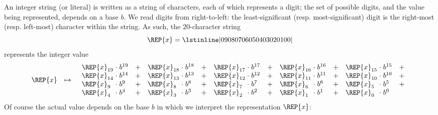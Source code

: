 %


An integer string (or literal) is written as a string of characters, 
each of which represents a digit; the set of possible digits, and the 
value being represented, depends on a base $b$.  We read digits from 
right-to-left: the least-significant (resp. most-significant) digit 
is the right-most (resp. left-most) character within the string.
As such, the $20$-character string
\[
      \REP{x}  =        \mbox{\lstinline|09080706050403020100|}
\]
represents the integer value
\[
      \begin{array}{lcl}
      \REP{x} &\mapsto& \begin{array}{*{5}{l@{\;}c@{\;}lc}}
                        \REP{x}_{19}  &\cdot&  b^{19} &+&
                        \REP{x}_{18}  &\cdot&  b^{18} &+&
                        \REP{x}_{17}  &\cdot&  b^{17} &+&
                        \REP{x}_{16}  &\cdot&  b^{16} &+&
                        \REP{x}_{15}  &\cdot&  b^{15} &+\\
                        \REP{x}_{14}  &\cdot&  b^{14} &+&
                        \REP{x}_{13}  &\cdot&  b^{13} &+&
                        \REP{x}_{12}  &\cdot&  b^{12} &+&
                        \REP{x}_{11}  &\cdot&  b^{11} &+&
                        \REP{x}_{10}  &\cdot&  b^{10} &+\\
                        \REP{x}_{ 9}  &\cdot&  b^{ 9} &+&
                        \REP{x}_{ 8}  &\cdot&  b^{ 8} &+&
                        \REP{x}_{ 7}  &\cdot&  b^{ 7} &+&
                        \REP{x}_{ 6}  &\cdot&  b^{ 6} &+&
                        \REP{x}_{ 5}  &\cdot&  b^{ 5} &+\\                    
                        \REP{x}_{ 4}  &\cdot&  b^{ 4} &+&
                        \REP{x}_{ 3}  &\cdot&  b^{ 3} &+&
                        \REP{x}_{ 2}  &\cdot&  b^{ 2} &+&
                        \REP{x}_{ 1}  &\cdot&  b^{ 1} &+&
                        \REP{x}_{ 0}  &\cdot&  b^{ 0} & \\
                        \end{array}
      \end{array}
\]
Of course the actual value depends on the base $b$ in which we interpret
the representation $\REP{x}$:

